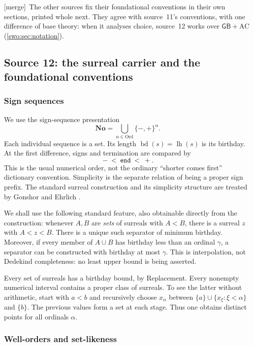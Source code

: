 \documentclass[11pt]{article}
\theoremstyle{definition}
\theoremstyle{remark}
\newcommand{\No}{\mathbf{No}}
\newcommand{\Ord}{\mathrm{Ord}}
\newcommand{\bd}{\operatorname{bd}}
\newcommand{\lh}{\operatorname{lh}}
\newcommand{\End}{\mathtt{end}}
\newcommand{\GB}{\mathsf{GB}}
\newcommand{\merge}{\textsf{[merge]}}
\begin{document}

\merge\ The other sources fix their foundational conventions in their own
sections, printed whole next. They agree with source~11's conventions, with
one difference of base theory: when it analyses choice, source~12 works over
$\GB+\mathrm{AC}$ (\cref{swo:sec:notation}).

\subsection{Source 12: the surreal carrier and the foundational conventions}
\label{swo:st:sec:foundations}

\subsubsection{Sign sequences}

We use the sign-sequence presentation
\[
 \No=\bigcup_{\alpha\in\Ord}\{-,+\}^{\alpha}.
\]
Each individual sequence is a set. Its length $\bd(s)=\lh(s)$ is its
birthday. At the first difference, signs and termination are compared by
\[
 -\ <\ \End\ <\ +.
\]
This is the usual numerical order, not the ordinary ``shorter comes
first'' dictionary convention. Simplicity is the separate relation of
being a proper sign prefix. The standard surreal construction and its
simplicity structure are treated by Gonshor and Ehrlich
\cite{Gonshor,Ehrlich2012}.

We shall use the following standard feature, also obtainable directly
from the construction: whenever $A,B$ are \emph{sets} of surreals with
$A<B$, there is a surreal $z$ with $A<z<B$. There is a unique such
separator of minimum birthday. Moreover, if every member of $A\cup B$
has birthday less than an ordinal $\gamma$, a separator can be constructed
with birthday at most $\gamma$. This is interpolation, not Dedekind
completeness: no least upper bound is being asserted.

Every set of surreals has a birthday bound, by Replacement. Every
nonempty numerical interval contains a proper class of surreals. To see
the latter without arithmetic, start with $a<b$ and recursively choose
$x_\alpha$ between $\{a\}\cup\{x_\xi:\xi<\alpha\}$ and $\{b\}$.
The previous values form a set at each stage. Thus one obtains distinct
points for all ordinals $\alpha$.

\subsubsection{Well-orders and set-likeness}
\end{document}
